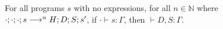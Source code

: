\begin{theorem}[Soundness]
For all programs $s$ with no  expressions,
for all $n \in \mathbb{N}$
where $\cdot ; \cdot ; \cdot ; s
\longrightarrow^n
H ; D ; S ; s'$,
%
if $\cdot \vdash s : \Gamma$,
then
$\vdash D, S : \Gamma$.
\end{theorem}
